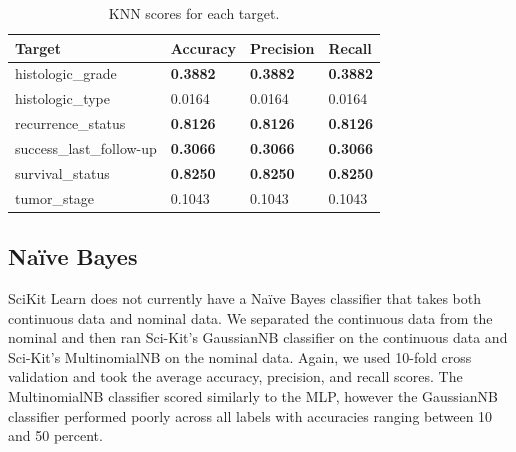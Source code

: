 \documentclass{article}
\begin{document}
\medskip
\begin{table}[H]
\begin{center}
\begin{tabular}{ *{4}{l} }
    \multicolumn{1}{p{1.5cm}}{\raggedright Target} &  
    \multicolumn{1}{p{1.5cm}}{\raggedright Accuracy} &  
    \multicolumn{1}{p{1.5cm}}{\raggedright Precision} &  
    \multicolumn{1}{p{1.5cm}}{\raggedright Recall} \\ \hline
histologic\_grade         &              \textbf{0.3882} &               \textbf{0.3882} &            \textbf{0.3882} \\
histologic\_type          &              0.0164 &               0.0164 &            0.0164 \\
recurrence\_status        &              \textbf{0.8126} &               \textbf{0.8126} &            \textbf{0.8126} \\
success\_last\_follow-up  &              \textbf{0.3066} &               \textbf{0.3066} &            \textbf{0.3066} \\
survival\_status          &              \textbf{0.8250} &               \textbf{0.8250} &            \textbf{0.8250} \\
tumor\_stage              &              0.1043 &               0.1043 &            0.1043 \\
\end{tabular}
\caption{KNN scores for each target.}
\end{center}
\end{table}

\subsection{Naïve Bayes}
SciKit Learn does not currently have a Naïve Bayes classifier that takes both continuous data and nominal data. We separated the continuous data from the nominal and then ran Sci-Kit's GaussianNB classifier on the continuous data and Sci-Kit's MultinomialNB on the nominal data. Again, we used 10-fold cross validation and took the average accuracy, precision, and recall scores. The MultinomialNB classifier scored similarly to the MLP, however the GaussianNB classifier performed poorly across all labels with accuracies ranging between 10 and 50 percent.
\end{document}
